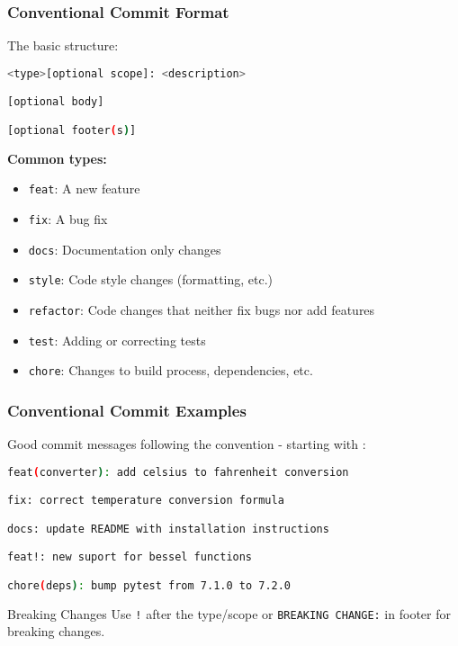 \begin{frame}[fragile]
	\frametitle{Conventional Commit Format}
	The basic structure:
	\begin{lstlisting}[language=bash, style=Shell]
<type>[optional scope]: <description>

[optional body]

[optional footer(s)]
	\end{lstlisting}
	\pause
	\textbf{Common types:}
	\begin{itemize}
		\item \texttt{feat}: A new feature
		\item \texttt{fix}: A bug fix  
		\item \texttt{docs}: Documentation only changes
		\item \texttt{style}: Code style changes (formatting, etc.)
		\item \texttt{refactor}: Code changes that neither fix bugs nor add features
		\item \texttt{test}: Adding or correcting tests
		\item \texttt{chore}: Changes to build process, dependencies, etc.
	\end{itemize}
\end{frame}

\begin{frame}[fragile]
	\frametitle{Conventional Commit Examples}
	Good commit messages following the convention - starting with :
	\begin{lstlisting}[language=bash, style=Shell]
feat(converter): add celsius to fahrenheit conversion

fix: correct temperature conversion formula

docs: update README with installation instructions

feat!: new suport for bessel functions

chore(deps): bump pytest from 7.1.0 to 7.2.0
	\end{lstlisting}
	\pause
	\begin{block}{Breaking Changes}
		{Use \texttt{!} after the type/scope or \texttt{BREAKING CHANGE:} in footer for breaking changes.}
	\end{block}
\end{frame}


